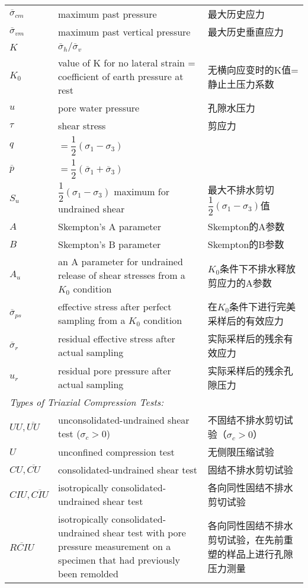 \begin{appendix}
\begin{longtable}{p{}p{}p{}}
    $\overline{\sigma}_{cm}$ & maximum past pressure & 最大历史应力 \\
    $\overline{\sigma}_{vm}$ & maximum past vertical pressure & 最大历史垂直应力 \\
    $K$ & $\overline{\sigma}_h/\overline{\sigma}_v$ & \\
    $K_0$ & value of K for no lateral strain = coefficient of earth pressure at rest & 无横向应变时的K值=静止土压力系数 \\
    $u$ & pore water pressure & 孔隙水压力 \\
    $\tau$ & shear stress & 剪应力 \\[3pt]
    $q$ & $=\dfrac{1}{2}(\sigma_1-\sigma_3)$ & \\[6pt]
    $\overline{p}$ & $=\dfrac{1}{2}(\overline{\sigma}_1+\overline{\sigma}_3)$ & \\[6pt]
    $S_u$ & $\dfrac{1}{2}(\sigma_1-\sigma_3)$ maximum for undrained shear & 最大不排水剪切$\dfrac{1}{2}(\sigma_1-\sigma_3)$值 \\[3pt]
    $A$ & Skempton's A parameter & Skempton的A参数 \\
    $B$ & Skempton's B parameter & Skempton的B参数 \\
    $A_u$ & an A parameter for undrained release of shear stresses from a $K_0$ condition & $K_0$条件下不排水释放剪应力的A参数 \\
    $\overline{\sigma}_{ps}$ & effective stress after perfect sampling from a $K_0$ condition & 在$K_0$条件下进行完美采样后的有效应力 \\
    $\overline{\sigma}_r$ & residual effective stress after actual sampling & 实际采样后的残余有效应力 \\
    $u_r$ & residual pore pressure after actual sampling & 实际采样后的残余孔隙压力 \\
    \multicolumn{3}{l}{\emph{Types of Triaxial Compression Tests:}} \\
    $UU,\overline{UU}$ & unconsolidated-undrained shear test ($\sigma_c>0$) & 不固结不排水剪切试验（$\sigma_c>0$） \\
    $U$ & unconfined compression test & 无侧限压缩试验 \\     
    $CU,\overline{CU}$ & consolidated-undrained shear test & 固结不排水剪切试验 \\
    $CIU,\overline{CIU}$ & isotropically consolidated-undrained shear test & 各向同性固结不排水剪切试验 \\
    $\overline{RCIU}$ & isotropically consolidated-undrained shear test with pore pressure measurement on a specimen that had previously been remolded & 各向同性固结不排水剪切试验，在先前重塑的样品上进行孔隙压力测量 \\

\end{longtable}
\end{appendix}

